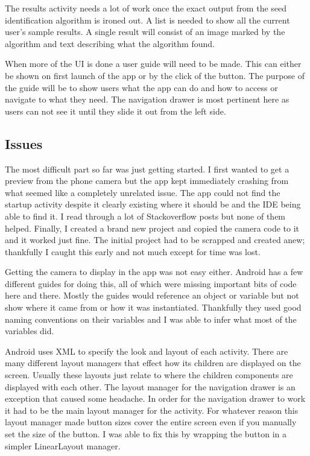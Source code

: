 \documentclass[onecolumn, draftclsnofoot,10pt, compsoc]{IEEEtran}
\begin{document}
		The results activity needs a lot of work once the exact output from the seed identification algorithm is ironed out.
		A list is needed to show all the current user's sample results.
		A single result will consist of an image marked by the algorithm and text describing what the algorithm found.

		When more of the UI is done a user guide will need to be made.
		This can either be shown on first launch of the app or by the click of the button.
		The purpose of the guide will be to show users what the app can do and how to access or navigate to what they need.
		The navigation drawer is most pertinent here as users can not see it until they slide it out from the left side.

	\subsection{Issues}
		The most difficult part so far was just getting started.
		I first wanted to get a preview from the phone camera but the app kept immediately crashing from what seemed like a completely unrelated issue.
		The app could not find the startup activity despite it clearly existing where it should be and the IDE being able to find it.
		I read through a lot of Stackoverflow posts but none of them helped.
		Finally, I created a brand new project and copied the camera code to it and it worked just fine.
		The initial project had to be scrapped and created anew; thankfully I caught this early and not much except for time was lost.
		
		Getting the camera to display in the app was not easy either.
		Android has a few different guides for doing this, all of which were missing important bits of code here and there.
		Mostly the guides would reference an object or variable but not show where it came from or how it was instantiated.
		Thankfully they used good naming conventions on their variables and I was able to infer what most of the variables did.

		Android uses XML to specify the look and layout of each activity.
		There are many different layout managers that effect how its children are displayed on the screen.
		Usually these layouts just relate to where the children components are displayed with each other.
		The layout manager for the navigation drawer is an exception that caused some headache.
		In order for the navigation drawer to work it had to be the main layout manager for the activity.
		For whatever reason this layout manager made button sizes cover the entire screen even if you manually set the size of the button.
		I was able to fix this by wrapping the button in a simpler LinearLayout manager.



\end{document}
